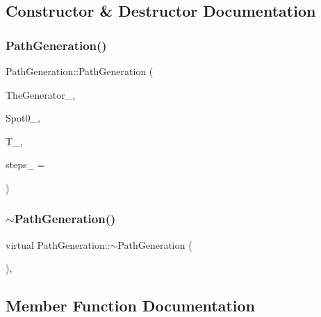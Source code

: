 \subsection{Constructor \& Destructor Documentation}
\hypertarget{classPathGeneration_ac8b6d80fa6fb84c11e66f1546963ba16}{}\label{classPathGeneration_ac8b6d80fa6fb84c11e66f1546963ba16} 
\subsubsection{\texorpdfstring{Path\+Generation()}{PathGeneration()}}
{\footnotesize\ttfamily Path\+Generation\+::\+Path\+Generation (\begin{DoxyParamCaption}\item[{std\+::shared\+\_\+ptr$<$ \hyperlink{classRandomBase}{Random\+Base} $>$}]{The\+Generator\+\_\+,  }\item[{double}]{Spot0\+\_\+,  }\item[{double}]{T\+\_\+,  }\item[{unsigned long}]{steps\+\_\+ = {} }\end{DoxyParamCaption})}

\hypertarget{classPathGeneration_a2677068f680c321802258f97403c008f}{}\label{classPathGeneration_a2677068f680c321802258f97403c008f} 
\subsubsection{\texorpdfstring{$\sim$\+Path\+Generation()}{~PathGeneration()}}
{\footnotesize\ttfamily virtual Path\+Generation\+::$\sim$\+Path\+Generation (\begin{DoxyParamCaption}{ }\end{DoxyParamCaption})\hspace{0.3cm}{\ttfamily [inline]}, {\ttfamily [virtual]}}



\subsection{Member Function Documentation}
\hypertarget{classPathGeneration_a9a64a37f4dd9b2b3ef84f3cb66aed843}{}\label{classPathGeneration_a9a64a37f4dd9b2b3ef84f3cb66aed843} 
